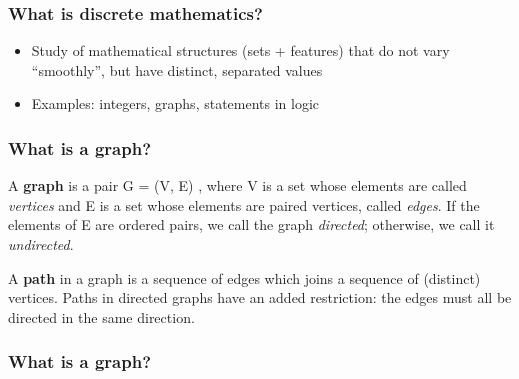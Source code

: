 \documentclass[11pt,table]{beamer}
\begin{document}
\begin{frame}
\frametitle{What is discrete mathematics?}
  \begin{itemize}
  \item{Study of mathematical structures (sets + features) that do not vary ``smoothly'', but have distinct, separated values}
    \medskip
  \item{Examples: integers, graphs, statements in logic}
  \end{itemize}
\end{frame}



  \begin{frame}
\frametitle{What is a graph?}
\begin{definition} A \textbf{graph} is a pair  G = (V, E) ,
  where V is a set whose elements are called \textit{vertices} and
  E is a set whose elements are paired vertices, called \textit{edges}.
  If the elements of E are ordered pairs, we call the graph \textit{directed}; otherwise, we call it \textit{undirected}.
\end{definition}
\bigskip
\begin{definition}
  A \textbf{path} in a graph is a sequence of edges which joins a sequence of (distinct) vertices. Paths in directed graphs have an added restriction: the edges must all be directed in the same direction.
\end{definition}
  \end{frame}

  \begin{frame}
\frametitle{What is a graph?}
\begin{columns}
\end{columns}
  \end{frame}
\end{document}
